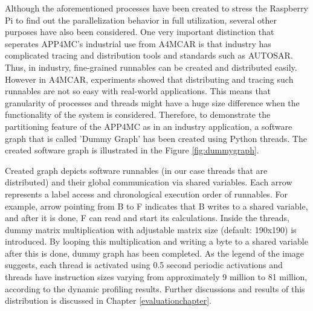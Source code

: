 Although the aforementioned processes have been created to stress the Raspberry Pi to find out the parallelization behavior in full utilization, several other purposes have also been considered. One very important distinction that seperates APP4MC's industrial use from A4MCAR is that industry has complicated tracing and distribution tools and standards such as AUTOSAR. Thus, in industry, fine-grained runnables can be created and distributed easily. However in A4MCAR, experiments showed that distributing and tracing such runnables are not so easy with real-world applications. This means that granularity of processes and threads might have a huge size difference when the functionality of the system is considered. Therefore, to demonstrate the partitioning feature of the APP4MC as in an industry application, a software graph that is called 'Dummy Graph' has been created using Python threads. The created software graph is illustrated in the Figure \ref{fig:dummygraph}.

Created graph depicts software runnables (in our case threads that are distributed) and their global communication via shared variables. Each arrow represents a label access and chronological execution order of runnables. For example, arrow pointing from B to F indicates that B writes to a shared variable, and after it is done, F can read and start its calculations. Inside the threads, dummy matrix multiplication with adjustable matrix size (default: 190x190) is introduced. By looping this multiplication and writing a byte to a shared variable after this is done, dummy graph has been completed. As the legend of the image suggests, each thread is activated using 0.5 second periodic activations and threads have instruction sizes varying from approximately 9 million to 81 million, according to the dynamic profiling results. Further discussions and results of this distribution is discussed in Chapter \ref{evaluationchapter}.

